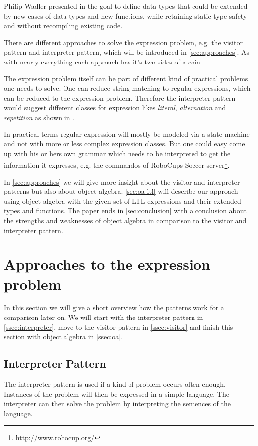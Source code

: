 \documentclass{llncs}
\begin{document}
Philip Wadler presented in \cite{wadler} the goal to define data types that could be extended by new cases of data types and new functions, while retaining static type safety and without recompiling existing code.

There are different approaches to solve the expression problem, e.g. the visitor pattern and interpreter pattern, which will be introduced in \autoref{sec:approaches}. As with nearly everything each approach has it's two sides of a coin. 

The expression problem itself can be part of different kind of practical problems one needs to solve. One can reduce string matching to regular expressions, which can be reduced to the expression problem. Therefore the interpreter pattern would suggest different classes for expression likes \emph{literal}, \emph{alternation} and \emph{repetition} as shown in \cite{GHJV}.

In practical terms regular expression will mostly be modeled via a state machine and not with more or less complex expression classes. But one could easy come up with his or hers own grammar which needs to be interpreted to get the information it expresses, e.g. the commandos of RoboCups Soccer server\footnote{http://www.robocup.org/}.

In \autoref{sec:approaches} we will give more insight about the visitor and interpreter patterns but also about object algebra. \autoref{sec:oa-ltl} will describe our approach using object algebra with the given set of LTL expressions and their extended types and functions. The paper ends in \autoref{sec:conclusion} with a conclusion about the strengths and weaknesses of object algebra in comparison to the visitor and interpreter pattern.

\section{Approaches to the expression problem} \label{sec:approaches}
In this section we will give a short overview how the patterns work for a comparison later on. We will start with the interpreter pattern in \autoref{ssec:interpreter}, move to the visitor pattern in \autoref{ssec:visitor} and finish this section with object algebra in \autoref{ssec:oa}.

\subsection{Interpreter Pattern} \label{ssec:interpreter}
The interpreter pattern is used if a kind of problem occurs often enough. Instances of the problem will then be expressed in a simple language. The interpreter can then solve the problem by interpreting the sentences of the language.
\end{document}
